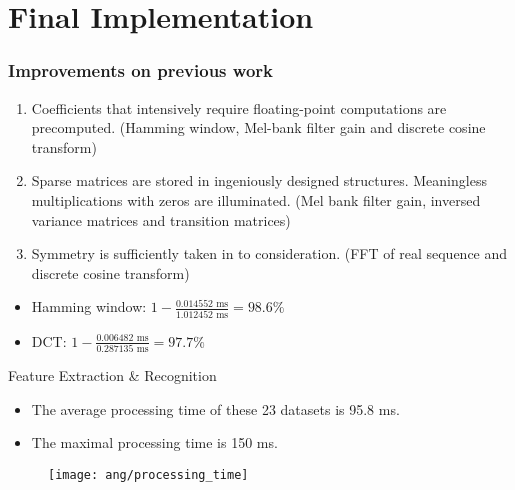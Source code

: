 \section{Final Implementation}


\begin{frame}
\frametitle{Improvements on previous work}
\begin{enumerate}
\item Coefficients that intensively require floating-point computations are precomputed. (Hamming window, Mel-bank filter gain and discrete cosine transform)
\item Sparse matrices are stored in ingeniously designed structures. Meaningless multiplications with zeros are illuminated. (Mel bank filter gain, inversed variance matrices and transition matrices)
\item Symmetry is sufficiently taken in to consideration. (FFT of real sequence and discrete cosine transform)
\end{enumerate}

\begin{itemize}
\item Hamming window: $1 - \frac{0.014552 \text{ ms}}{1.012452 \text{ ms}} = 98.6\%$
\item DCT: $1 - \frac{0.006482 \text{ ms}}{0.287135 \text{ ms}} = 97.7\%$
\end{itemize}
\end{frame}


\begin{frame}
Feature Extraction \& Recognition
\begin{itemize}
\item The average processing time of these 23 datasets is 95.8 ms.
\item The maximal processing time is 150 ms.
\end{itemize}

\begin{figure}[H]
\centering
\texttt{[image: ang/processing\_time]}
\end{figure}
\end{frame}


